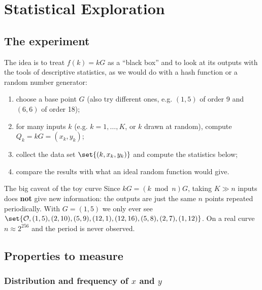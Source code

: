 \section{Statistical Exploration}
\label{sec:stats}


\subsection{The experiment}

The idea is to treat $f(k) = kG$ as a ``black box'' and to look at its outputs with the tools of descriptive statistics, as we would do with a hash function or a random number generator:
\begin{enumerate}
  \item choose a base point $G$ (also try different ones, e.g. $(1,5)$ of order 9 and $(6,6)$ of order 18);
  \item for many inputs $k$ (e.g. $k = 1, \ldots, K$, or $k$ drawn at random), compute $Q_k = kG = (x_k, y_k)$;
  \item collect the data set $\set{(k, x_k, y_k)}$ and compute the statistics below;
  \item compare the results with what an ideal random function would give.
\end{enumerate}

\begin{framedobs}{The big caveat of the toy curve}
  Since $kG = (k \bmod n) G$, taking $K \gg n$ inputs does \textbf{not} give new information: the outputs are just the same $n$ points repeated periodically. With $G = (1,5)$ we only ever see $\set{\mathcal{O}, (1,5), (2,10), (5,9), (12,1), (12,16), (5,8), (2,7), (1,12)}$. On a real curve $n \approx 2^{256}$ and the period is never observed.
\end{framedobs}

\subsection{Properties to measure}

\subsubsection{Distribution and frequency of $x$ and $y$}

